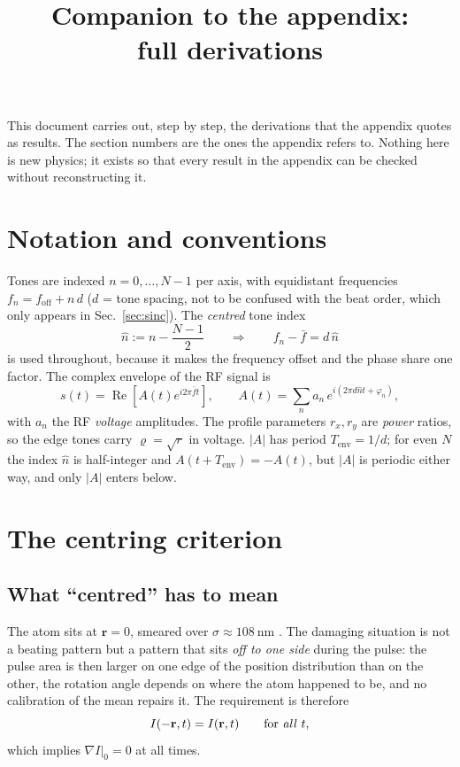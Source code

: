 \documentclass[11pt,a4paper]{article}
\title{Companion to the appendix:\\ full derivations}
\author{}\date{}
\begin{document}
\maketitle
\noindent This document carries out, step by step, the derivations that the
appendix quotes as results. The section numbers are the ones the appendix
refers to. Nothing here is new physics; it exists so that every result in the
appendix can be checked without reconstructing it.
\tableofcontents

\section{Notation and conventions}\label{sec:not}
Tones are indexed $n=0,\dots,N-1$ per axis, with equidistant frequencies
$f_n=f_\mathrm{off}+n\,d$ ($d$ = tone spacing, not to be confused with the beat
order, which only appears in Sec.~\ref{sec:sinc}). The \emph{centred} tone index
\begin{equation}
\hat n:=n-\frac{N-1}{2}
\qquad\Longrightarrow\qquad f_n-\bar f=d\,\hat n
\label{eq:nhat}
\end{equation}
is used throughout, because it makes the frequency offset and the phase share
one factor. The complex envelope of the RF signal is
\begin{equation}
s(t)=\operatorname{Re}\!\left[A(t)e^{i2\pi\bar ft}\right],
\qquad
A(t)=\sum_{n}a_n\,e^{i(2\pi d\hat nt+\varphi_n)} ,
\label{eq:env}
\end{equation}
with $a_n$ the RF \emph{voltage} amplitudes. The profile parameters $r_x,r_y$
are \emph{power} ratios, so the edge tones carry
$\varrho=\sqrt{r}$ in voltage. $|A|$ has period $T_\mathrm{env}=1/d$; for even
$N$ the index $\hat n$ is half-integer and $A(t+T_\mathrm{env})=-A(t)$, but
$|A|$ is periodic either way, and only $|A|$ enters below.

\section{The centring criterion}\label{sec:centring}

\subsection{What ``centred'' has to mean}
The atom sits at $\mathbf r=0$, smeared over $\sigma\approx\SI{108}{\nano\meter}$
\citep{tuchendler2008}. The damaging situation is not a beating pattern but a
pattern that sits \emph{off to one side} during the pulse: the pulse area is
then larger on one edge of the position distribution than on the other, the
rotation angle depends on where the atom happened to be, and no calibration of
the mean repairs it. The requirement is therefore
\begin{equation}
I(-\mathbf r,t)=I(\mathbf r,t)\qquad\text{for \emph{all} }t,
\label{eq:centred}
\end{equation}
which implies $\nabla I|_0=0$ at all times.
\end{document}
